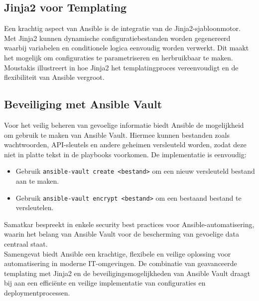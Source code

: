  \subsection*{Jinja2 voor Templating}
  Een krachtig aspect van Ansible is de integratie van de Jinja2-sjabloonmotor. 
  Met Jinja2 kunnen dynamische configuratiebestanden worden gegenereerd waarbij variabelen en conditionele logica eenvoudig worden verwerkt. 
  Dit maakt het mogelijk om configuraties te parametriseren en herbruikbaar te maken. 
  Moustakis illustreert in \textcite{Moustakis2023} hoe Jinja2 het templatingproces vereenvoudigt en de flexibiliteit van Ansible vergroot.
  
  \subsection*{Beveiliging met Ansible Vault}
  Voor het veilig beheren van gevoelige informatie biedt Ansible de mogelijkheid om gebruik te maken van Ansible Vault. 
  Hiermee kunnen bestanden zoals wachtwoorden, API-sleutels en andere geheimen versleuteld worden, zodat deze niet in platte tekst in de playbooks voorkomen. 
  De implementatie is eenvoudig:
  \begin{itemize}
      \item Gebruik \texttt{ansible-vault create <bestand>} om een nieuw versleuteld bestand aan te maken.
      \item Gebruik \texttt{ansible-vault encrypt <bestand>} om een bestaand bestand te versleutelen.
  \end{itemize}
  Samatkar bespreekt in \textcite{Samatkar2023} enkele security best practices voor Ansible-automatisering, waarin het belang van Ansible Vault voor de bescherming van gevoelige data centraal staat.\\
  
  \noindent Samengevat biedt Ansible een krachtige, flexibele en veilige oplossing voor automatisering in moderne IT-omgevingen. 
  De combinatie van geavanceerde templating met Jinja2 en de beveiligingsmogelijkheden van Ansible Vault draagt bij aan een efficiënte en veilige implementatie van configuraties en deploymentprocessen.
  